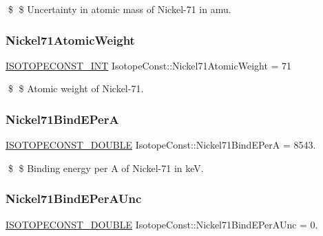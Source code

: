 \$ \$ Uncertainty in atomic mass of Nickel-\/71 in amu. \mbox{\label{group___isotope_const-_nickel-_ni71_gab0630db010eed2fcf461bdddf9d1ce4d}} 
\subsubsection{\texorpdfstring{Nickel71\+Atomic\+Weight}{Nickel71AtomicWeight}}
{\footnotesize\ttfamily \mbox{\hyperlink{group___isotope_const-_macros_ga5f18360b3e99483a35c32d789e62621c}{I\+S\+O\+T\+O\+P\+E\+C\+O\+N\+S\+T\+\_\+\+I\+NT}} Isotope\+Const\+::\+Nickel71\+Atomic\+Weight = 71}

\$ \$ Atomic weight of Nickel-\/71. \mbox{\label{group___isotope_const-_nickel-_ni71_gaede2448febe4b27f3906bdc131d54b29}} 
\subsubsection{\texorpdfstring{Nickel71\+Bind\+E\+PerA}{Nickel71BindEPerA}}
{\footnotesize\ttfamily \mbox{\hyperlink{group___isotope_const-_macros_ga8f45a7272ce02c0b4c65c44636ed719a}{I\+S\+O\+T\+O\+P\+E\+C\+O\+N\+S\+T\+\_\+\+D\+O\+U\+B\+LE}} Isotope\+Const\+::\+Nickel71\+Bind\+E\+PerA = 8543.}

\$ \$ Binding energy per A of Nickel-\/71 in keV. \mbox{\label{group___isotope_const-_nickel-_ni71_ga5dde427028dabfa108bf1e3170811999}} 
\subsubsection{\texorpdfstring{Nickel71\+Bind\+E\+Per\+A\+Unc}{Nickel71BindEPerAUnc}}
{\footnotesize\ttfamily \mbox{\hyperlink{group___isotope_const-_macros_ga8f45a7272ce02c0b4c65c44636ed719a}{I\+S\+O\+T\+O\+P\+E\+C\+O\+N\+S\+T\+\_\+\+D\+O\+U\+B\+LE}} Isotope\+Const\+::\+Nickel71\+Bind\+E\+Per\+A\+Unc = 0.}

